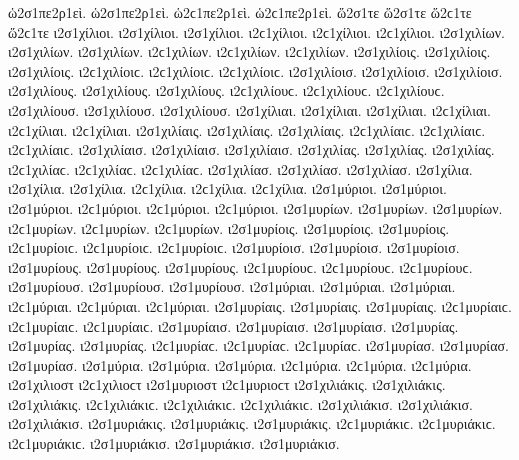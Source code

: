 {ὡ2σ1πε2ρ1εὶ. ὡ2σ1πε2ρ1εὶ. ὡ2ϲ1πε2ρ1εὶ. ὡ2ϲ1πε2ρ1εὶ. 
ὥ2σ1τε ὥ2σ1τε ὥ2ϲ1τε ὥ2ϲ1τε   %
ι2σ1χίλιοι. ι2σ1χίλιοι. ι2σ1χίλιοι. ι2ϲ1χίλιοι. ι2ϲ1χίλιοι. ι2ϲ1χίλιοι.   %
ι2σ1χιλίων. ι2σ1χιλίων. ι2σ1χιλίων. ι2ϲ1χιλίων. ι2ϲ1χιλίων. ι2ϲ1χιλίων. 
ι2σ1χιλίοις. ι2σ1χιλίοις. ι2σ1χιλίοις. ι2ϲ1χιλίοιϲ. ι2ϲ1χιλίοιϲ. ι2ϲ1χιλίοιϲ. 
ι2σ1χιλίοισ. ι2σ1χιλίοισ. ι2σ1χιλίοισ. 
ι2σ1χιλίους. ι2σ1χιλίους. ι2σ1χιλίους. ι2ϲ1χιλίουϲ. ι2ϲ1χιλίουϲ. ι2ϲ1χιλίουϲ. 
ι2σ1χιλίουσ. ι2σ1χιλίουσ. ι2σ1χιλίουσ. 
ι2σ1χίλιαι. ι2σ1χίλιαι. ι2σ1χίλιαι. ι2ϲ1χίλιαι. ι2ϲ1χίλιαι. ι2ϲ1χίλιαι. 
ι2σ1χιλίαις. ι2σ1χιλίαις. ι2σ1χιλίαις. ι2ϲ1χιλίαιϲ. ι2ϲ1χιλίαιϲ. ι2ϲ1χιλίαιϲ. 
ι2σ1χιλίαισ. ι2σ1χιλίαισ. ι2σ1χιλίαισ. 
ι2σ1χιλίας. ι2σ1χιλίας. ι2σ1χιλίας. ι2ϲ1χιλίαϲ. ι2ϲ1χιλίαϲ. ι2ϲ1χιλίαϲ. 
ι2σ1χιλίασ. ι2σ1χιλίασ. ι2σ1χιλίασ. 
ι2σ1χίλια. ι2σ1χίλια. ι2σ1χίλια. ι2ϲ1χίλια. ι2ϲ1χίλια. ι2ϲ1χίλια. 
%
ι2σ1μύριοι. ι2σ1μύριοι. ι2σ1μύριοι. ι2ϲ1μύριοι. ι2ϲ1μύριοι. ι2ϲ1μύριοι.   %
ι2σ1μυρίων. ι2σ1μυρίων. ι2σ1μυρίων. ι2ϲ1μυρίων. ι2ϲ1μυρίων. ι2ϲ1μυρίων. 
ι2σ1μυρίοις. ι2σ1μυρίοις. ι2σ1μυρίοις. ι2ϲ1μυρίοιϲ. ι2ϲ1μυρίοιϲ. ι2ϲ1μυρίοιϲ. 
ι2σ1μυρίοισ. ι2σ1μυρίοισ. ι2σ1μυρίοισ. 
ι2σ1μυρίους. ι2σ1μυρίους. ι2σ1μυρίους. ι2ϲ1μυρίουϲ. ι2ϲ1μυρίουϲ. ι2ϲ1μυρίουϲ. 
ι2σ1μυρίουσ. ι2σ1μυρίουσ. ι2σ1μυρίουσ. 
ι2σ1μύριαι. ι2σ1μύριαι. ι2σ1μύριαι. ι2ϲ1μύριαι. ι2ϲ1μύριαι. ι2ϲ1μύριαι. 
ι2σ1μυρίαις. ι2σ1μυρίαις. ι2σ1μυρίαις. ι2ϲ1μυρίαιϲ. ι2ϲ1μυρίαιϲ. ι2ϲ1μυρίαιϲ. 
ι2σ1μυρίαισ. ι2σ1μυρίαισ. ι2σ1μυρίαισ. 
ι2σ1μυρίας. ι2σ1μυρίας. ι2σ1μυρίας. ι2ϲ1μυρίαϲ. ι2ϲ1μυρίαϲ. ι2ϲ1μυρίαϲ. 
ι2σ1μυρίασ. ι2σ1μυρίασ. ι2σ1μυρίασ. 
ι2σ1μύρια. ι2σ1μύρια. ι2σ1μύρια. ι2ϲ1μύρια. ι2ϲ1μύρια. ι2ϲ1μύρια. 
%
ι2σ1χιλιοστ ι2ϲ1χιλιοϲτ   %
%
ι2σ1μυριοστ ι2ϲ1μυριοϲτ   %
%
ι2σ1χιλιάκις. ι2σ1χιλιάκις. ι2σ1χιλιάκις. ι2ϲ1χιλιάκιϲ. ι2ϲ1χιλιάκιϲ. ι2ϲ1χιλιάκιϲ.   %
ι2σ1χιλιάκισ. ι2σ1χιλιάκισ. ι2σ1χιλιάκισ. 
%
ι2σ1μυριάκις. ι2σ1μυριάκις. ι2σ1μυριάκις. ι2ϲ1μυριάκιϲ. ι2ϲ1μυριάκιϲ. ι2ϲ1μυριάκιϲ.   %
ι2σ1μυριάκισ. ι2σ1μυριάκισ. ι2σ1μυριάκισ. 
}
